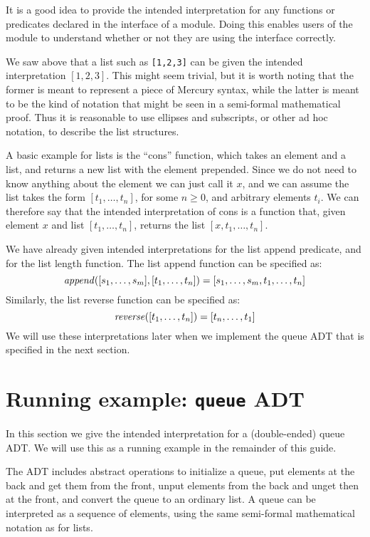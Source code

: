 It is a good idea to
provide the intended interpretation
for any functions or predicates
declared in the interface of a module.
Doing this enables users of the module
to understand whether or not they are
using the interface correctly.

We saw above that a list such as \texttt{[1,2,3]}
can be given the intended interpretation $[1, 2, 3]$.
This might seem trivial,
but it is worth noting that
the former is meant to represent a piece of Mercury syntax,
while the latter is meant to be the kind of notation
that might be seen in a semi-formal mathematical proof.
Thus it is reasonable to use ellipses and subscripts,
or other ad hoc notation,
to describe the list structures.

A basic example for lists is the ``cons'' function,
which takes an element and a list,
and returns a new list with the element prepended.
Since we do not need to know anything about the element
we can just call it $x$,
and we can assume the list takes the form $[t_1, \ldots, t_n]$,
for some $n \geqslant 0$, and arbitrary elements $t_i$.
We can therefore say that
the intended interpretation of cons is a function that,
given element $x$ and list $[t_1, \ldots, t_n]$,
returns the list $[x, t_1, \ldots, t_n]$.

We have already given intended interpretations
for the list append predicate,
and for the list length function.
The list append function can be specified as:
\[
    \text{\textit{append}}([s_1, \ldots, s_m], [t_1, \ldots, t_n]) =
        [s_1, \ldots, s_m, t_1, \ldots, t_n]
\]
Similarly, the list reverse function can be specified as:
\[
    \text{\textit{reverse}}([t_1, \ldots, t_n]) = [t_n, \ldots, t_1]
\]
We will use these interpretations later
when we implement the queue ADT
that is specified in the next section.


\section{Running example: \texttt{queue} ADT}
\label{sec:queue-spec}

In this section we give the intended interpretation for
a (double-ended) queue ADT.
We will use this as a running example
in the remainder of this guide.

The ADT includes abstract operations to initialize a queue,
put elements at the back and get them from the front,
unput elements from the back and unget then at the front,
and convert the queue to an ordinary list.
A queue can be interpreted as a sequence of elements,
using the same semi-formal mathematical notation as for lists.

